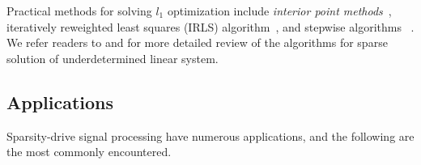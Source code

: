 Practical methods for solving $l_1$ optimization include \emph{interior point methods}~\cite{Chen2001,Candes2005,Kim2007},
iteratively reweighted least squares (IRLS) algorithm~\cite{Rao2003,Chartrand2008,Daubechies2010}, and stepwise algorithms
~\cite{Osborne2000, Plumbley2005, Efron2004}. We refer readers to \cite{Bruckstein2009} and \cite{Tropp2010} for more detailed review of the algorithms for sparse solution of underdetermined linear system.


\subsection{Applications}

Sparsity-drive signal processing have numerous applications, and the following
are the most commonly encountered.

